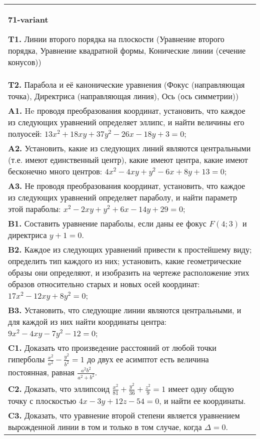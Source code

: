 \documentclass{article}
\begin{document}
\begin{tabular}{m{17cm}}
\textbf{71-variant}
\newline

\textbf{T1.} Линии второго порядка на плоскости (Уравнение второго порядка, Уравнение квадратной формы, Конические линии (сечение конусов)) \\
\textbf{T2.} Парабола и её канонические уравнения (Фокус (направляющая точка), Директриса (направляющая линия), Ось (ось симметрии)) \\
\textbf{A1.} He проводя преобразования координат, установить, что каждое из следующих уравнений определяет эллипс, и найти величины его полуосей: $13 x^2+18 x y+37 y^2-26 x-18 y+3=0$; \\
\textbf{A2.} Установить, какие из следующих линий являются центральными (т.е. имеют единственный центр), какие имеют центра, какие имеют бесконечно много центров: $4 x^2-4 x y+y^2-6 x+8 y+13=0$; \\
\textbf{A3.} Не проводя преобразования координат, установить, что каждое из следующих уравнений определяет параболу, и найти параметр этой параболы: $x^2-2 x y+y^2+6 x-14 y+29=0$; \\
\textbf{B1.} Составить уравнение параболы, если даны ее фокус $F(4 ; 3)$ и директриса $y+1=0$. \\
\textbf{B2.} Каждое из следующих уравнений привести к простейшему виду; определить тип каждого из них; установить, какие геометрические образы они определяют, и изобразить на чертеже расположение этих образов относительно старых и новых осей координат: $17 x^2-12 x y+8 y^2=0$; \\
\textbf{B3.} Установить, что следующие линии являются центральными, и для каждой из них найти координаты центра: $9 x^2-4 x y-7 y^2-12=0$; \\
\textbf{C1.} Доказать что произведение расстояний от любой точки гиперболы $\frac{x^2}{a^2}-\frac{y^2}{b^2}=1$ до двух ее асимптот есть величина постоянная, равная $\frac{a^2 b^2}{a^2+b^2}$. \\
\textbf{C2.} Доказать, что эллипсоид $\frac{x^2}{81}+\frac{y^2}{36}+\frac{z^2}{9}=1$ имеет одну общую точку с плоскостью $4 x-3 y+12 z-54=0$, и найти ее координаты. \\
\textbf{C3.} Доказать, что уравнение второй степени является уравнением вырожденной линии в том и только в том случае, когда $\Delta=0$. \\

\end{tabular}
\vspace{1cm}
\end{document}
